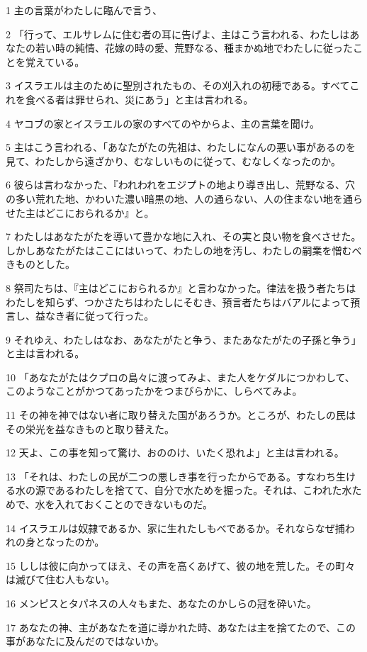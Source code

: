 \par 1 主の言葉がわたしに臨んで言う、
\par 2 「行って、エルサレムに住む者の耳に告げよ、主はこう言われる、わたしはあなたの若い時の純情、花嫁の時の愛、荒野なる、種まかぬ地でわたしに従ったことを覚えている。
\par 3 イスラエルは主のために聖別されたもの、その刈入れの初穂である。すべてこれを食べる者は罪せられ、災にあう」と主は言われる。
\par 4 ヤコブの家とイスラエルの家のすべてのやからよ、主の言葉を聞け。
\par 5 主はこう言われる、「あなたがたの先祖は、わたしになんの悪い事があるのを見て、わたしから遠ざかり、むなしいものに従って、むなしくなったのか。
\par 6 彼らは言わなかった、『われわれをエジプトの地より導き出し、荒野なる、穴の多い荒れた地、かわいた濃い暗黒の地、人の通らない、人の住まない地を通らせた主はどこにおられるか』と。
\par 7 わたしはあなたがたを導いて豊かな地に入れ、その実と良い物を食べさせた。しかしあなたがたはここにはいって、わたしの地を汚し、わたしの嗣業を憎むべきものとした。
\par 8 祭司たちは、『主はどこにおられるか』と言わなかった。律法を扱う者たちはわたしを知らず、つかさたちはわたしにそむき、預言者たちはバアルによって預言し、益なき者に従って行った。
\par 9 それゆえ、わたしはなお、あなたがたと争う、またあなたがたの子孫と争う」と主は言われる。
\par 10 「あなたがたはクプロの島々に渡ってみよ、また人をケダルにつかわして、このようなことがかつてあったかをつまびらかに、しらべてみよ。
\par 11 その神を神ではない者に取り替えた国があろうか。ところが、わたしの民はその栄光を益なきものと取り替えた。
\par 12 天よ、この事を知って驚け、おののけ、いたく恐れよ」と主は言われる。
\par 13 「それは、わたしの民が二つの悪しき事を行ったからである。すなわち生ける水の源であるわたしを捨てて、自分で水ためを掘った。それは、こわれた水ためで、水を入れておくことのできないものだ。
\par 14 イスラエルは奴隷であるか、家に生れたしもべであるか。それならなぜ捕われの身となったのか。
\par 15 ししは彼に向かってほえ、その声を高くあげて、彼の地を荒した。その町々は滅びて住む人もない。
\par 16 メンピスとタパネスの人々もまた、あなたのかしらの冠を砕いた。
\par 17 あなたの神、主があなたを道に導かれた時、あなたは主を捨てたので、この事があなたに及んだのではないか。
